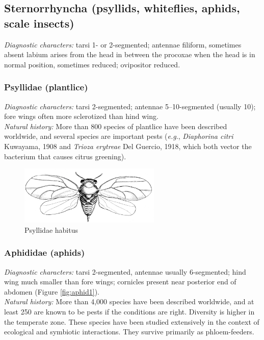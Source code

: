 \documentclass[letterpaper, 11pt]{article}
\begin{document}
\subsection{Sternorrhyncha (psyllids, whiteflies, aphids, scale insects)}
\noindent{}\textit{Diagnostic characters:} tarsi 1- or 2-segmented; antennae filiform, sometimes absent labium arises from the head in between the procoxae when the head is in normal position, sometimes reduced; ovipositor reduced.\\

\subsubsection{Psyllidae (plantlice)}
\noindent{}\textit{Diagnostic characters:} tarsi 2-segmented; antennae 5--10-segmented (usually 10); fore wings often more sclerotized than hind wing.\\

\noindent{}\textit{Natural history:} More than 800 species of plantlice have been described worldwide, and several species are important pests (\textit{e.g}., \textit{Diaphorina citri} Kuwayama, 1908 and \textit{Trioza erytreae} Del Guercio, 1918, which both vector the bacterium that causes citrus greening).\\

\begin{figure}[ht!]
 \centering
 \includegraphics[width=0.6\textwidth]{PsyllidHabitus}
 \caption{Psyllidae habitus \citep[][Fig. 10d]{bhlpart17516}}
 \label{fig:psyllid}
\end{figure}

\subsubsection{Aphididae (aphids)}
\noindent{}\textit{Diagnostic characters:} tarsi 2-segmented, antennae usually 6-segmented; hind wing much smaller than fore wings; cornicles present near posterior end of abdomen (Figure \ref{fig:aphid1}).\\

\noindent{}\textit{Natural history:} More than 4,000 species have been described worldwide, and at least 250 are known to be pests if the conditions are right. Diversity is higher in the temperate zone. These species have been studied extensively in the context of ecological and symbiotic interactions. They survive primarily as phloem-feeders.\\
\end{document}
